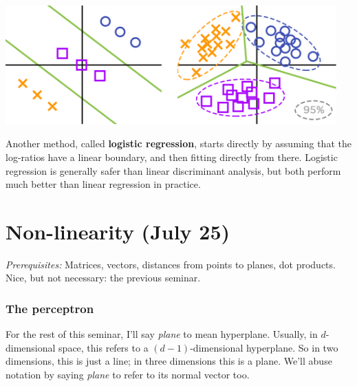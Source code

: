 \documentclass[11pt,paper=letter]{scrartcl}
\begin{document}
\begin{center}
  \includegraphics[height=1.8in]{10.png}
\end{center}

Another method, called \textbf{logistic regression}, starts directly by assuming that the log-ratios have a linear boundary, and then fitting directly from there. Logistic regression is generally safer than linear discriminant analysis, but both perform much better than linear regression in practice.


\clearpage

\section{Non-linearity (July 25)}

\textit{Prerequisites:} Matrices, vectors, distances from points to planes, dot products. Nice, but not necessary: the previous seminar.

\subsubsection*{The perceptron}

For the rest of this seminar, I'll say \textit{plane} to mean hyperplane. Usually, in $d$-dimensional space, this refers to a $(d-1)$-dimensional hyperplane. So in two dimensions, this is just a line; in three dimensions this is a plane. We'll abuse notation by saying \textit{plane} to refer to its normal vector too.
\end{document}
